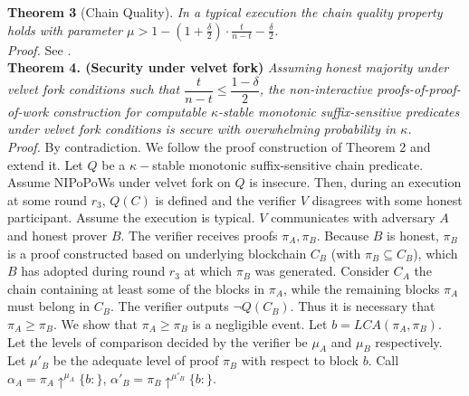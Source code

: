\documentclass[11pt,a4paper]{article}
\begin{document}
\textbf{Theorem 3 }(Chain Quality)\cite{Backbone}. \textit{In a typical execution the chain quality property holds with parameter $\mu > 1 - (1 + \frac{\delta}{2}) \cdot \frac{t}{n-t} - \frac{\delta}{2}$.}\\
\textit{Proof.} See \cite{Backbone}.\\


\textbf{Theorem 4. (Security under velvet fork)} \textit{Assuming honest majority under velvet fork conditions such that $\dfrac{t}{n-t} \leq \dfrac{1-\delta}{2}$, the non-interactive proofs-of-proof-of-work construction for computable $\kappa$-stable monotonic suffix-sensitive predicates under velvet fork conditions is secure with overwhelming probability in $\kappa$.}\\

\textit{Proof.} By contradiction. We follow the proof construction of Theorem 2 and extend it. Let $Q$ be a $\kappa-$stable monotonic suffix-sensitive chain predicate. Assume NIPoPoWs under velvet fork on $Q$ is insecure. Then, during an execution at some round  $r_3$, $Q(C)$ is defined and the verifier $V$ disagrees with some honest participant. Assume the execution is typical. $V$ communicates with adversary $A$ and honest prover $B$. The verifier receives proofs $\pi_A, \pi_B$. Because $B$ is honest, $\pi_B$ is a proof constructed based on underlying blockchain $C_B$ (with $\pi_B \subseteq C_B$), which $B$ has adopted during round $r_3$ at which $\pi_B$ was generated. Consider $C_A$ the chain containing at least some of the blocks in $\pi_A$, while the remaining blocks $\pi_A$ must belong in $C_B$. 
The verifier outputs $\neg Q(C_B)$. Thus it is necessary that $\pi_A \geq \pi_B$. We show that $\pi_A \geq \pi_B$ is a negligible event. 
Let $b = LCA(\pi_A, \pi_B)$. Let the levels of comparison decided by the verifier be $\mu_A$ and $\mu_B$ respectively. Let $\mu'_B$ be the adequate level of proof $\pi_B$  with respect to block $b$. Call $\alpha_A = \pi_A \uparrow^{\mu_A}\{b:\}$, 
$\alpha'_B = \pi_B \uparrow^{\mu'_B}\{b:\}$.
\end{document}
